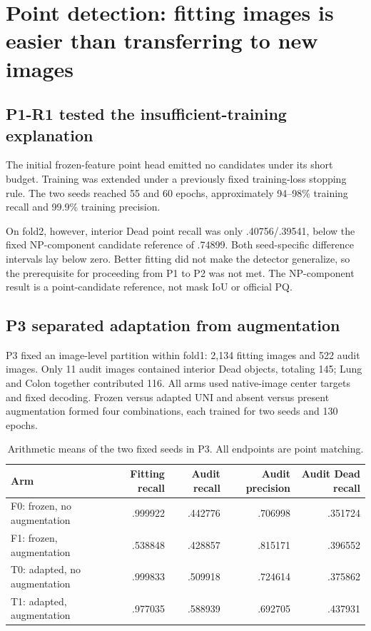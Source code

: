 \documentclass[11pt,a4paper]{article}
\begin{document}
\section{Point detection: fitting images is easier than transferring to new images}

\subsection{P1-R1 tested the insufficient-training explanation}

The initial frozen-feature point head emitted no candidates under its short budget. Training was extended under a previously fixed training-loss stopping rule. The two seeds reached 55 and 60 epochs, approximately 94--98\% training recall and 99.9\% training precision.

On fold2, however, interior Dead point recall was only .40756/.39541, below the fixed NP-component candidate reference of .74899. Both seed-specific difference intervals lay below zero. Better fitting did not make the detector generalize, so the prerequisite for proceeding from P1 to P2 was not met. The NP-component result is a point-candidate reference, not mask IoU or official PQ.

\subsection{P3 separated adaptation from augmentation}

P3 fixed an image-level partition within fold1: 2,134 fitting images and 522 audit images. Only 11 audit images contained interior Dead objects, totaling 145; Lung and Colon together contributed 116. All arms used native-image center targets and fixed decoding. Frozen versus adapted UNI and absent versus present augmentation formed four combinations, each trained for two seeds and 130 epochs.

\begin{table}[H]\centering\small
\begin{tabular}{lrrrr}\toprule
Arm & Fitting recall & Audit recall & Audit precision & Audit Dead recall\\\midrule
F0: frozen, no augmentation & .999922 & .442776 & .706998 & .351724\\
F1: frozen, augmentation & .538848 & .428857 & .815171 & .396552\\
T0: adapted, no augmentation & .999833 & .509918 & .724614 & .375862\\
T1: adapted, augmentation & .977035 & .588939 & .692705 & .437931\\\bottomrule
\end{tabular}
\caption{Arithmetic means of the two fixed seeds in P3. All endpoints are point matching.}
\end{table}
\end{document}
